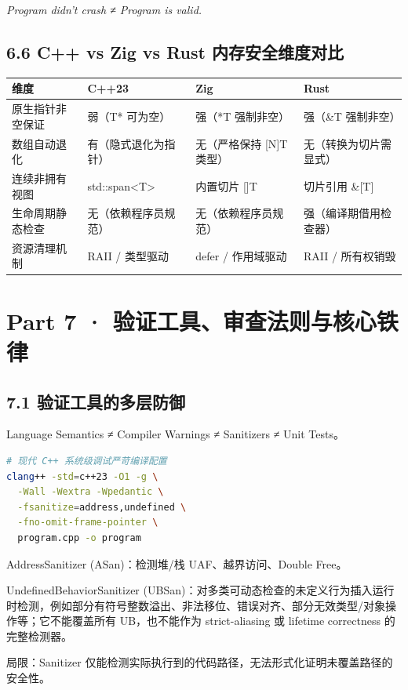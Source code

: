 \documentclass[11pt,a4paper]{article}
\begin{document}
\textit{Program didn't crash ≠ Program is valid.}

\subsection{6.6 C++ vs Zig vs Rust 内存安全维度对比}
\begin{table}[htbp]
\centering
\small
\begin{tabularx}{\textwidth}{| X | X | X | X |}
\hline
\rowcolor{codebg}
\textbf{维度} & \textbf{C++23} & \textbf{Zig} & \textbf{Rust} \\ \hline
原生指针非空保证 & 弱（T* 可为空） & 强（*T 强制非空） & 强（\&T 强制非空） \\ \hline
\rowcolor{codebg!50} 数组自动退化 & 有（隐式退化为指针） & 无（严格保持 [N]T 类型） & 无（转换为切片需显式） \\ \hline
连续非拥有视图 & std::span<T> & 内置切片 []T & 切片引用 \&[T] \\ \hline
\rowcolor{codebg!50} 生命周期静态检查 & 无（依赖程序员规范） & 无（依赖程序员规范） & 强（编译期借用检查器） \\ \hline
资源清理机制 & RAII / 类型驱动 & defer / 作用域驱动 & RAII / 所有权销毁 \\ \hline
\end{tabularx}
\end{table}
\section{Part 7 · 验证工具、审查法则与核心铁律}
\subsection{7.1 验证工具的多层防御}
Language Semantics ≠ Compiler Warnings ≠ Sanitizers ≠ Unit Tests。

\begin{lstlisting}[language=bash]
# 现代 C++ 系统级调试严苛编译配置
clang++ -std=c++23 -O1 -g \
  -Wall -Wextra -Wpedantic \
  -fsanitize=address,undefined \
  -fno-omit-frame-pointer \
  program.cpp -o program
\end{lstlisting}
AddressSanitizer (ASan)：检测堆/栈 UAF、越界访问、Double Free。

UndefinedBehaviorSanitizer (UBSan)：对多类可动态检查的未定义行为插入运行时检测，例如部分有符号整数溢出、非法移位、错误对齐、部分无效类型/对象操作等；它不能覆盖所有 UB，也不能作为 strict-aliasing 或 lifetime correctness 的完整检测器。

局限：Sanitizer 仅能检测实际执行到的代码路径，无法形式化证明未覆盖路径的安全性。
\end{document}
